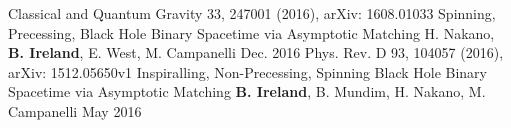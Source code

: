 \begin{cvhonors}
  \cvhonor
    {Classical and Quantum Gravity 33, 247001 (2016), arXiv: 1608.01033}
    {Spinning, Precessing, Black Hole Binary Spacetime via Asymptotic Matching}
    {H. Nakano, \textbf{B. Ireland}, E. West, M. Campanelli}
    {Dec. 2016}
    {
     }
  \cvhonor
    {Phys. Rev. D 93, 104057 (2016), arXiv: 1512.05650v1}
    {Inspiralling, Non-Precessing, Spinning Black Hole Binary Spacetime via Asymptotic Matching}
    {\textbf{B. Ireland}, B. Mundim, H. Nakano, M. Campanelli}
    {May 2016}
    {
    }
\end{cvhonors}
